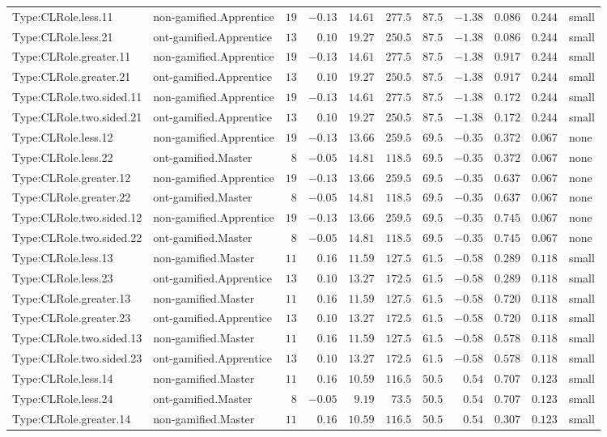 \documentclass[6pt,a4paper]{article}
\begin{document}
{\begin{longtable}{llrrrrrrrrl}
Type:CLRole.less.11&non-gamified.Apprentice&$19$&$-0.13$&$14.61$&$277.5$&$ 87.5$&$-1.38$&$0.086$&$0.244$&small\tabularnewline
Type:CLRole.less.21&ont-gamified.Apprentice&$13$&$ 0.10$&$19.27$&$250.5$&$ 87.5$&$-1.38$&$0.086$&$0.244$&small\tabularnewline
Type:CLRole.greater.11&non-gamified.Apprentice&$19$&$-0.13$&$14.61$&$277.5$&$ 87.5$&$-1.38$&$0.917$&$0.244$&small\tabularnewline
Type:CLRole.greater.21&ont-gamified.Apprentice&$13$&$ 0.10$&$19.27$&$250.5$&$ 87.5$&$-1.38$&$0.917$&$0.244$&small\tabularnewline
Type:CLRole.two.sided.11&non-gamified.Apprentice&$19$&$-0.13$&$14.61$&$277.5$&$ 87.5$&$-1.38$&$0.172$&$0.244$&small\tabularnewline
Type:CLRole.two.sided.21&ont-gamified.Apprentice&$13$&$ 0.10$&$19.27$&$250.5$&$ 87.5$&$-1.38$&$0.172$&$0.244$&small\tabularnewline
Type:CLRole.less.12&non-gamified.Apprentice&$19$&$-0.13$&$13.66$&$259.5$&$ 69.5$&$-0.35$&$0.372$&$0.067$&none\tabularnewline
Type:CLRole.less.22&ont-gamified.Master&$ 8$&$-0.05$&$14.81$&$118.5$&$ 69.5$&$-0.35$&$0.372$&$0.067$&none\tabularnewline
Type:CLRole.greater.12&non-gamified.Apprentice&$19$&$-0.13$&$13.66$&$259.5$&$ 69.5$&$-0.35$&$0.637$&$0.067$&none\tabularnewline
Type:CLRole.greater.22&ont-gamified.Master&$ 8$&$-0.05$&$14.81$&$118.5$&$ 69.5$&$-0.35$&$0.637$&$0.067$&none\tabularnewline
Type:CLRole.two.sided.12&non-gamified.Apprentice&$19$&$-0.13$&$13.66$&$259.5$&$ 69.5$&$-0.35$&$0.745$&$0.067$&none\tabularnewline
Type:CLRole.two.sided.22&ont-gamified.Master&$ 8$&$-0.05$&$14.81$&$118.5$&$ 69.5$&$-0.35$&$0.745$&$0.067$&none\tabularnewline
Type:CLRole.less.13&non-gamified.Master&$11$&$ 0.16$&$11.59$&$127.5$&$ 61.5$&$-0.58$&$0.289$&$0.118$&small\tabularnewline
Type:CLRole.less.23&ont-gamified.Apprentice&$13$&$ 0.10$&$13.27$&$172.5$&$ 61.5$&$-0.58$&$0.289$&$0.118$&small\tabularnewline
Type:CLRole.greater.13&non-gamified.Master&$11$&$ 0.16$&$11.59$&$127.5$&$ 61.5$&$-0.58$&$0.720$&$0.118$&small\tabularnewline
Type:CLRole.greater.23&ont-gamified.Apprentice&$13$&$ 0.10$&$13.27$&$172.5$&$ 61.5$&$-0.58$&$0.720$&$0.118$&small\tabularnewline
Type:CLRole.two.sided.13&non-gamified.Master&$11$&$ 0.16$&$11.59$&$127.5$&$ 61.5$&$-0.58$&$0.578$&$0.118$&small\tabularnewline
Type:CLRole.two.sided.23&ont-gamified.Apprentice&$13$&$ 0.10$&$13.27$&$172.5$&$ 61.5$&$-0.58$&$0.578$&$0.118$&small\tabularnewline
Type:CLRole.less.14&non-gamified.Master&$11$&$ 0.16$&$10.59$&$116.5$&$ 50.5$&$ 0.54$&$0.707$&$0.123$&small\tabularnewline
Type:CLRole.less.24&ont-gamified.Master&$ 8$&$-0.05$&$ 9.19$&$ 73.5$&$ 50.5$&$ 0.54$&$0.707$&$0.123$&small\tabularnewline
Type:CLRole.greater.14&non-gamified.Master&$11$&$ 0.16$&$10.59$&$116.5$&$ 50.5$&$ 0.54$&$0.307$&$0.123$&small\tabularnewline

\end{longtable}}
\end{document}
